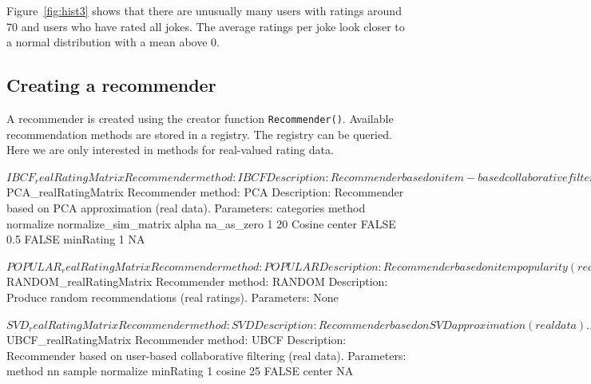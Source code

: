 \documentclass[nojss]{jss}
\newcommand{\func}[1]{\mbox{\texttt{#1()}}}
\begin{document}
Figure~\ref{fig:hist3} shows that there are unusually many
users with ratings around 70 and users who have rated all jokes.
The average ratings per joke look closer to a normal distribution with
a mean above 0.


\subsection{Creating a recommender}

A recommender is created using the creator function \func{Recommender}.
Available recommendation methods are stored in a registry.
The registry can be queried. Here we are only interested in
methods for real-valued rating data.

\begin{Schunk}
\begin{Soutput}
$IBCF_realRatingMatrix
Recommender method: IBCF
Description: Recommender based on item-based collaborative filtering (real data).
Parameters:
   k method normalize normalize_sim_matrix alpha na_as_zero minRating
1 30 Cosine    center                FALSE   0.5      FALSE        NA

$PCA_realRatingMatrix
Recommender method: PCA
Description: Recommender based on PCA approximation (real data).
Parameters:
  categories method normalize normalize_sim_matrix alpha na_as_zero
1         20 Cosine    center                FALSE   0.5      FALSE
  minRating
1        NA

$POPULAR_realRatingMatrix
Recommender method: POPULAR
Description: Recommender based on item popularity (real data).
Parameters: None

$RANDOM_realRatingMatrix
Recommender method: RANDOM
Description: Produce random recommendations (real ratings).
Parameters: None

$SVD_realRatingMatrix
Recommender method: SVD
Description: Recommender based on SVD approximation (real data).
Parameters:
  categories method normalize normalize_sim_matrix alpha treat_na
1         50 Cosine    center                FALSE   0.5   median
  minRating
1        NA

$UBCF_realRatingMatrix
Recommender method: UBCF
Description: Recommender based on user-based collaborative filtering (real data).
Parameters:
  method nn sample normalize minRating
1 cosine 25  FALSE    center        NA
\end{Soutput}
\end{Schunk}
\end{document}
